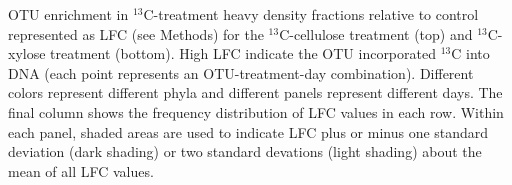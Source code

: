 OTU enrichment in $^{13}$C-treatment heavy density fractions relative to control 
represented as LFC (see Methods) for the $^{13}$C-cellulose treatment (top) and
$^{13}$C-xylose treatment (bottom). High LFC indicate the OTU incorporated $^{13}$C into
DNA (each point represents an OTU-treatment-day combination). Different colors
represent different phyla and different panels represent different days. The
final column shows the frequency distribution of LFC values in each row.
Within each panel, shaded areas are used to indicate LFC plus or minus
one standard deviation (dark shading) or two standard devations (light shading) 
about the mean of all LFC values.
    
    
